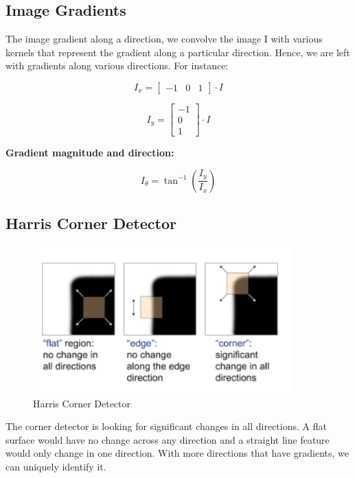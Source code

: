 \subsection{Image Gradients}

The image gradient along a direction, we convolve the image I with various kernels that represent the gradient along a particular direction. Hence, we are left with gradients along various directions. For instance:

\begin{equation*}
    I_x = \begin{bmatrix}-1 & 0 & 1\end{bmatrix}\cdot I
\end{equation*}

\begin{equation*}
    I_y = \begin{bmatrix}-1 \\ 0 \\ 1\end{bmatrix} \cdot I
\end{equation*}

\textbf{Gradient magnitude and direction:}

\begin{equation*}
    I_{\theta} = \tan^{-1}(\frac{I_y}{I_x})
\end{equation*}

\subsection{Harris Corner Detector} 

\begin{figure}
    \centering
    \includegraphics[width=10cm]{img/harris-corner.png}
    \caption{Harris Corner Detector}
    \label{fig:harris}
\end{figure}

The corner detector is looking for significant changes in all directions. A flat surface would have no change across any direction and a straight line feature would only change in one direction. With more directions that have gradients, we can uniquely identify it.

